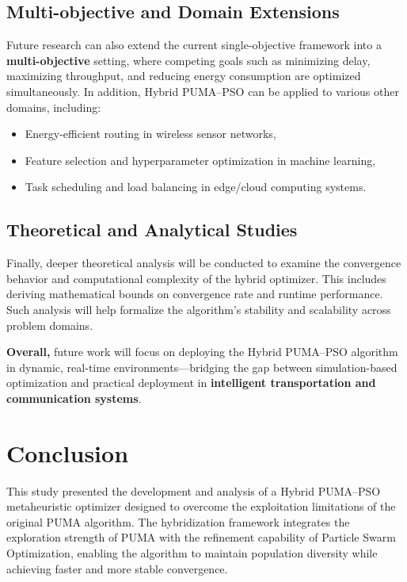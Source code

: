 \documentclass[a4paper,12pt]{article}
\begin{document}
\subsection{Multi-objective and Domain Extensions}
Future research can also extend the current single-objective framework into a 
\textbf{multi-objective} setting, where competing goals such as 
minimizing delay, maximizing throughput, and reducing energy consumption 
are optimized simultaneously.  
In addition, Hybrid PUMA–PSO can be applied to various other domains, including:
\begin{itemize}
    \item Energy-efficient routing in wireless sensor networks,
    \item Feature selection and hyperparameter optimization in machine learning,
    \item Task scheduling and load balancing in edge/cloud computing systems.
\end{itemize}

\subsection{Theoretical and Analytical Studies}
Finally, deeper theoretical analysis will be conducted to examine the 
convergence behavior and computational complexity of the hybrid optimizer. 
This includes deriving mathematical bounds on convergence rate and runtime 
performance.  
Such analysis will help formalize the algorithm’s stability and scalability 
across problem domains.

\vspace{4pt}
\noindent
\textbf{Overall,} future work will focus on deploying the Hybrid PUMA–PSO 
algorithm in dynamic, real-time environments—bridging the gap between 
simulation-based optimization and practical deployment in 
\textbf{intelligent transportation and communication systems}.

\section{Conclusion}
\label{sec:conclusion}

This study presented the development and analysis of a Hybrid PUMA–PSO 
metaheuristic optimizer designed to overcome the exploitation limitations of 
the original PUMA algorithm. 
The hybridization framework integrates the exploration strength of PUMA with 
the refinement capability of Particle Swarm Optimization, enabling the algorithm 
to maintain population diversity while achieving faster and more stable convergence.
\end{document}
